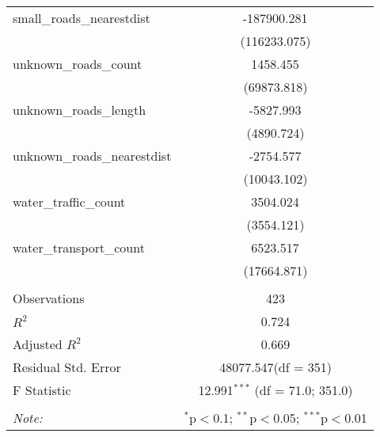 \begin{table}[!htbp]
\begin{tabular}{@{\extracolsep{5pt}}lc}
 small_roads_nearestdist & -187900.281$^{}$ \\
  & (116233.075) \\
 unknown_roads_count & 1458.455$^{}$ \\
  & (69873.818) \\
 unknown_roads_length & -5827.993$^{}$ \\
  & (4890.724) \\
 unknown_roads_nearestdist & -2754.577$^{}$ \\
  & (10043.102) \\
 water_traffic_count & 3504.024$^{}$ \\
  & (3554.121) \\
 water_transport_count & 6523.517$^{}$ \\
  & (17664.871) \\
\hline \\[-1.8ex]
 Observations & 423 \\
 $R^2$ & 0.724 \\
 Adjusted $R^2$ & 0.669 \\
 Residual Std. Error & 48077.547(df = 351)  \\
 F Statistic & 12.991$^{***}$ (df = 71.0; 351.0) \\
\hline
\hline \\[-1.8ex]
\textit{Note:} & \multicolumn{1}{r}{$^{*}$p$<$0.1; $^{**}$p$<$0.05; $^{***}$p$<$0.01} \\
\end{tabular}
\end{table}